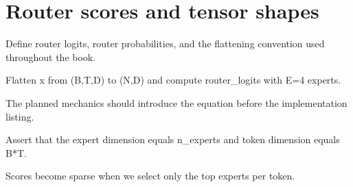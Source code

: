 \section{Router scores and tensor shapes}
\label{sec:ch03-router-scores-and-tensor-shapes}

Define router logits, router probabilities, and the flattening convention used throughout the book.



Flatten x from (B,T,D) to (N,D) and compute router\_logits with E=4 experts.



The planned mechanics should introduce the equation before the implementation listing.





\begin{checkpointbox}
Assert that the expert dimension equals n\_experts and token dimension equals B*T.
\end{checkpointbox}

Scores become sparse when we select only the top experts per token.
